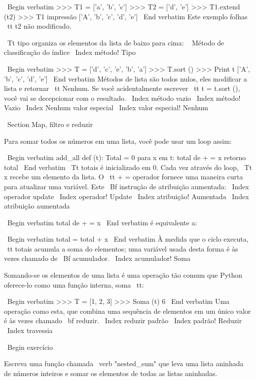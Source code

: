 \documentclass[10pt]{book}
\begin{document}
\begin {itemize}
{{{{{{\ Begin {verbatim}
>>> T1 = ['a', 'b', 'c']
>>> T2 = ['d', 'e']
>>> T1.extend (t2)
>>> T1 impressão
['A', 'b', 'c', 'd', 'e']
\ End {verbatim}
%
Este exemplo folhas {\ tt} t2 não modificado.

{\ Tt tipo} organiza os elementos da lista de baixo para cima:
\ {} Método de classificação do índice
\ Index {método! Tipo}

\ Begin {verbatim}
>>> T = ['d', 'c', 'e', ​​'b', 'a']
>>> T.sort ()
>>> Print t
['A', 'b', 'c', 'd', 'e']
\ End {verbatim}
%
Métodos de lista são todos nulos, eles modificar a lista e retornar {\ tt Nenhum}.
Se você acidentalmente escrever {\ tt t = t.sort ()}, você vai se decepcionar
com o resultado.
\ Index {método vazio}
\ Index {método! Vazio}
\ Index {Nenhum valor especial}
\ Index {valor especial! Nenhum}


\ Section {Map, filtro e reduzir}

Para somar todos os números em uma lista, você pode usar um loop assim:


\ Begin {verbatim}
add_all def (t):
    Total = 0
    para x em t:
        total de + = x
    retorno total
\ End {verbatim}
%
{\ Tt totais} é inicializado em 0. Cada vez através do loop,
{\ Tt x} recebe um elemento da lista. O {\ tt + = operador}
fornece uma maneira curta para atualizar uma variável. Este
{\ Bf instrução de atribuição aumentada}:
\ Index {operador update}
\ Index {operador! Update}
\ Index {atribuição! Aumentada}
\ Index {atribuição aumentada}

\ Begin {verbatim}
    total de + = x
\ End {verbatim}
%
é equivalente a:

\ Begin {verbatim}
    total = total + x
\ End {verbatim}
%
À medida que o ciclo executa, {\ tt totais} acumula a soma do
elementos; uma variável usada desta forma é às vezes chamado de
{\ Bf acumulador}.
\ Index {acumulador! Soma}

Somando-se os elementos de uma lista é uma operação tão comum
que Python oferece-lo como uma função interna, {soma \ tt}:

\ Begin {verbatim}
>>> T = [1, 2, 3]
>>> Soma (t)
6
\ End {verbatim}
%
Uma operação como esta, que combina uma sequência de elementos em
um único valor é às vezes chamado {\ bf reduzir}.
\ Index {reduzir padrão}
\ Index {padrão! Reduzir}
\ Index {travessia}

\ Begin {} exercício

Escreva uma função chamada \ verb "nested_sum" que leva uma lista aninhada
de números inteiros e somar os elementos de todas as listas aninhadas.

}}}}}}
\end{itemize}
\end{document}
